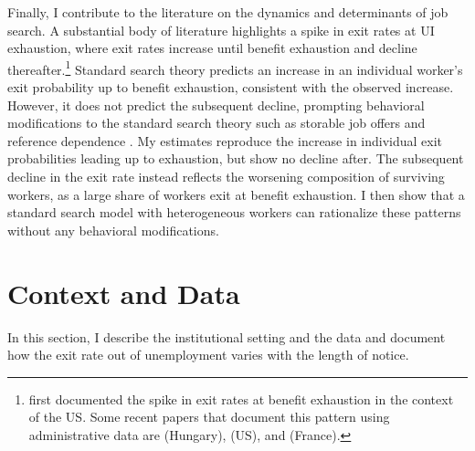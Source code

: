 \documentclass{div}
\begin{document}
Finally, I contribute to the literature on the dynamics and determinants of job search. A substantial body of literature highlights a spike in exit rates at UI exhaustion, where exit rates increase until benefit exhaustion and decline thereafter.\footnote{\cite{KatzMeyer1990} first documented the spike in exit rates at benefit exhaustion in the context of the US. Some recent papers that document this pattern using administrative data are \cite{DellaVignaEtAl2017} (Hungary), \cite{GanongNoel2019} (US), and \cite{MarinescuSkandalis2021} (France).} Standard search theory predicts an increase in an individual worker's exit probability up to benefit exhaustion, consistent with the observed increase. However, it does not predict the subsequent decline, prompting behavioral modifications to the standard search theory such as storable job offers \citep{BoonevanOurs2012} and reference dependence \citep{DellaVignaEtAl2017}. My estimates reproduce the increase in individual exit probabilities leading up to exhaustion, but show no decline after. The subsequent decline in the exit rate instead reflects the worsening composition of surviving workers, as a large share of workers exit at benefit exhaustion. I then show that a standard search model with heterogeneous workers can rationalize these patterns without any behavioral modifications. %


\section{Context and Data}\label{sec_data}

In this section, I describe the institutional setting and the data and document how the exit rate out of unemployment varies with the length of notice. 
\end{document}

